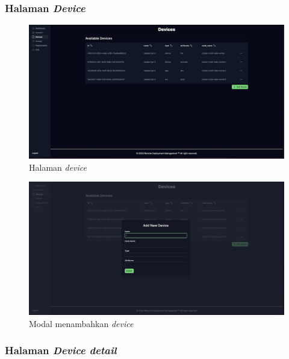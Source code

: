 \subsubsection{Halaman \textit{Device}}

\begin{figure}
  \centering
  \includegraphics[width=1\textwidth]{resources/chapter-4/dashboard/device-page.jpg}
  \caption{Halaman \textit{device}}
  \label{fig:halaman-device}
\end{figure}

\begin{figure}
  \centering
  \includegraphics[width=1\textwidth]{resources/chapter-4/dashboard/device-page-add.jpg}
  \caption{Modal menambahkan \textit{device}}
  \label{fig:halaman-device-add}
\end{figure}

\subsubsection{Halaman \textit{Device detail}}

